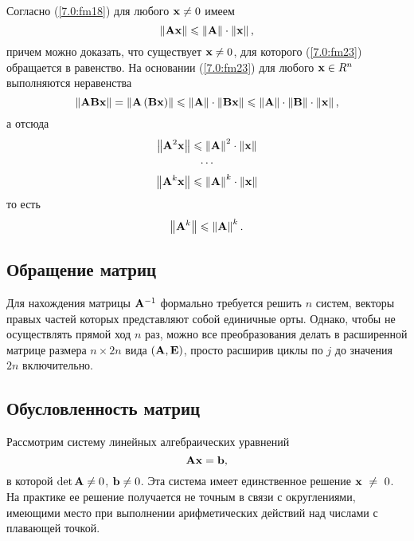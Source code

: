 \documentclass[12pt]{article}
\newcommand{\norm}[1]{\left\| #1 \right\|}
\begin{document}
	Согласно (\ref{7.0:fm18}) для любого $\bold{x} \neq 0$ имеем
	\begin{equation}
		\norm{\bold{Ax}}\leqslant\norm{\bold{A}}\cdot \norm{\bold{x}},\label{7.0:fm23}
	\end{equation}
	причем можно доказать, что существует $\bold{x}\neq 0$, для которого (\ref{7.0:fm23}) обращается в равенство.
	На основании (\ref{7.0:fm23}) для любого $\bold{x} \in R^n$ выполняются неравенства
	\begin{equation}
		\norm{\bold{ABx}}=\norm{\bold{A}\left(\bold{Bx}\right)}\leqslant \norm{\bold{A}}\cdot\norm{\bold{Bx}}\leqslant\norm{\bold{A}}\cdot\norm{\bold{B}}\cdot\norm{\bold{x}},
	\end{equation}
	а отсюда
	\begin{equation}
		\begin{gathered}
			\norm{\bold{A}^2\bold{x}}\leqslant\norm{\bold{A}}^2\cdot \norm{\bold{x}} \\
			\cdots\\
			\norm{\bold{A}^k\bold{x}}\leqslant\norm{\bold{A}}^k\cdot \norm{\bold{x}}
		\end{gathered}
	\end{equation}
	то есть
	\begin{equation}
		\norm{\bold{A}^k}\leqslant\norm{\bold{A}}^k.
	\end{equation}
	
	\subsection*{Обращение матриц}
	Для нахождения матрицы $\bold{A}^{-1}$ формально требуется решить $n$ систем, векторы правых частей которых представляют собой единичные орты. Однако, чтобы не осуществлять прямой ход $n$ раз, можно все преобразования делать в расширенной матрице размера $n \times 2n$ вида $\left(\bold{A},\bold{E}\right)$, просто расширив циклы по $j$ до значения $2n$ включительно.
	
	\subsection*{Обусловленность матриц}
	
	Рассмотрим систему линейных алгебраических уравнений
	\begin{equation}
		\bold{Ax}=\bold{b},\label{7.0:fm27}
	\end{equation}
	в которой $\det \bold{A} \neq 0$, $\bold{b}\neq 0$. Эта система имеет единственное решение $\bold{x}~\neq~0$. На практике ее решение получается не точным в связи с округлениями, имеющими место при выполнении арифметических действий над числами с плавающей точкой.
	
\end{document}
